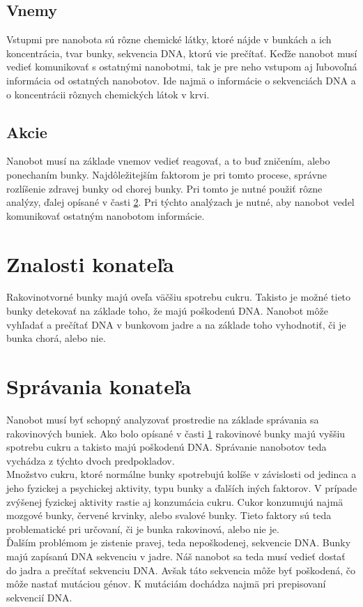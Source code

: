 \documentclass[10pt,twoside,slovak,a4paper]{article}
\begin{document}
\subsection{Vnemy}
Vstupmi pre nanobota sú rôzne chemické látky, ktoré nájde v bunkách a ich koncentrácia, tvar bunky, sekvencia DNA, ktorú vie prečítať. Keďže nanobot musí vedieť komunikovať s ostatnými nanobotmi, tak je pre neho vstupom aj ľubovoľná informácia od ostatných nanobotov. Ide najmä o informácie o sekvenciách DNA a o koncentrácii rôznych chemických látok v krvi.

\subsection{Akcie}
Nanobot musí na základe vnemov vedieť reagovať, a to buď zničením, alebo ponechaním bunky. Najdôležitejším faktorom je pri tomto procese, správne rozlíšenie zdravej bunky od chorej bunky. Pri tomto je nutné použiť rôzne analýzy, ďalej opísané v časti \ref{sec:spravanie}. Pri týchto analýzach je nutné, aby nanobot vedel komunikovať ostatným nanobotom informácie.


\section{Znalosti konateľa}
\label{sec:znalosti}
Rakovinotvorné bunky majú oveľa väčšiu spotrebu cukru. Takisto je možné tieto bunky detekovať na základe toho, že majú poškodenú DNA. Nanobot môže vyhľadať a prečítať DNA v bunkovom jadre a na základe toho vyhodnotiť, či je bunka chorá, alebo nie.
\cite{Wikipedia-nador,cancer-cell-metabolism}

\section{Správania konateľa}
\label{sec:spravanie}
Nanobot musí byť schopný analyzovať prostredie na základe správania sa rakovinových buniek. Ako bolo opísané v časti \ref{sec:znalosti} rakovinové bunky majú vyššiu spotrebu cukru a takisto majú poškodenú DNA. Správanie nanobotov teda vychádza z týchto dvoch predpokladov.
\\
Množstvo cukru, ktoré normálne bunky spotrebujú kolíše v závislosti od jedinca a jeho fyzickej a psychickej aktivity, typu bunky a ďalších iných faktorov. V prípade zvýšenej fyzickej aktivity rastie aj konzumácia cukru. Cukor konzumujú najmä mozgové bunky, červené krvinky, alebo svalové bunky. Tieto faktory sú teda problematické pri určovaní, či je bunka rakovinová, alebo nie je.
\\
Ďalším problémom je zistenie pravej, teda nepoškodenej, sekvencie DNA. Bunky majú zapísanú DNA sekvenciu v jadre. Náš nanobot sa teda musí vedieť dostať do jadra a prečítať sekvenciu DNA. Avšak táto sekvencia môže byť poškodená, čo môže nastať mutáciou génov. K mutáciám dochádza najmä pri prepisovaní sekvencií DNA.
\cite{Wikipedia-glukoza, Wikipedia-jadro, Wikipedia-mutations}
\end{document}
